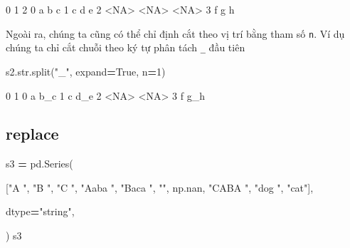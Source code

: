 \documentclass[
]{book}
\newenvironment{Shaded}{\begin{snugshade}}{\end{snugshade}}
\newcommand{\BuiltInTok}[1]{#1}
\newcommand{\DecValTok}[1]{\textcolor[rgb]{0.00,0.00,0.81}{#1}}
\newcommand{\NormalTok}[1]{#1}
\newcommand{\OperatorTok}[1]{\textcolor[rgb]{0.81,0.36,0.00}{\textbf{#1}}}
\newcommand{\StringTok}[1]{\textcolor[rgb]{0.31,0.60,0.02}{#1}}
\newcommand{\VariableTok}[1]{\textcolor[rgb]{0.00,0.00,0.00}{#1}}
\begin{document}
\begin{Shaded}
\begin{Highlighting}[]
\NormalTok{      0     1     2​}
\NormalTok{0     a     b     c​}
\NormalTok{1     c     d     e​}
\NormalTok{2  \textless{}NA\textgreater{}  \textless{}NA\textgreater{}  \textless{}NA\textgreater{}​}
\NormalTok{3     f     g     h}
\end{Highlighting}
\end{Shaded}

Ngoài ra, chúng ta cũng có thể chỉ định cắt theo vị trí bằng tham số \texttt{n}. Ví dụ chúng ta chỉ cắt chuỗi theo ký tự phân tách \texttt{\_} đầu tiên

\begin{Shaded}
\begin{Highlighting}[]
\NormalTok{s2.}\BuiltInTok{str}\NormalTok{.split(}\StringTok{"\_"}\NormalTok{, expand}\OperatorTok{=}\VariableTok{True}\NormalTok{, n}\OperatorTok{=}\DecValTok{1}\NormalTok{)​}
\end{Highlighting}
\end{Shaded}

\begin{Shaded}
\begin{Highlighting}[]
\NormalTok{      0     1}
\NormalTok{0     a   b\_c}
\NormalTok{1     c   d\_e}
\NormalTok{2  \textless{}NA\textgreater{}  \textless{}NA\textgreater{}}
\NormalTok{3     f   g\_h}
\end{Highlighting}
\end{Shaded}

\subsection{replace}\label{replace}

\begin{Shaded}
\begin{Highlighting}[]
\NormalTok{s3 }\OperatorTok{=}\NormalTok{ pd.Series(​}

\NormalTok{    [}\StringTok{"A "}\NormalTok{, }\StringTok{"B "}\NormalTok{, }\StringTok{"C "}\NormalTok{, }\StringTok{"Aaba "}\NormalTok{, }\StringTok{"Baca "}\NormalTok{, }\StringTok{""}\NormalTok{, np.nan, }\StringTok{"CABA "}\NormalTok{, }\StringTok{"dog "}\NormalTok{, }\StringTok{"cat"}\NormalTok{],​}

\NormalTok{    dtype}\OperatorTok{=}\StringTok{"string"}\NormalTok{,​}

\NormalTok{)​}
\NormalTok{s3}
\end{Highlighting}
\end{Shaded}
\end{document}
